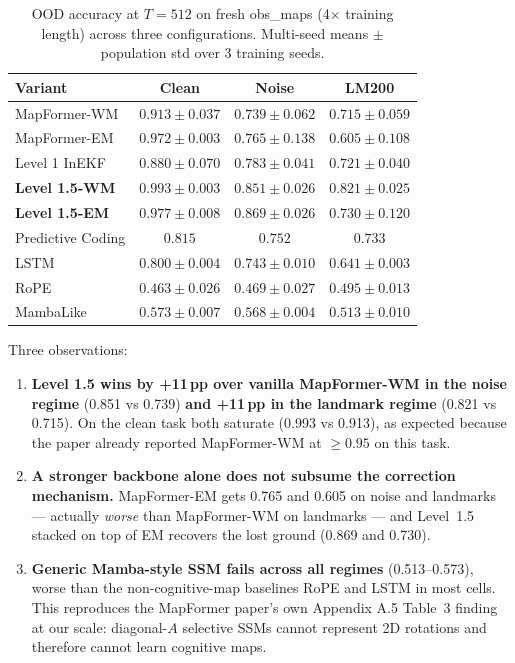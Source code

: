 \begin{table}[h]
\centering
\caption{OOD accuracy at $T{=}512$ on fresh obs\_maps (4$\times$ training
length) across three configurations. Multi-seed means $\pm$ population
std over 3 training seeds.}
\label{tab:main}
\small
\begin{tabular}{lccc}
\toprule
Variant & Clean & Noise & LM200 \\
\midrule
MapFormer-WM & $0.913 \pm 0.037$ & $0.739 \pm 0.062$ & $0.715 \pm 0.059$ \\
MapFormer-EM & $\mathbf{0.972 \pm 0.003}$ & $0.765 \pm 0.138$ & $0.605 \pm 0.108$ \\
Level 1 InEKF & $0.880 \pm 0.070$ & $0.783 \pm 0.041$ & $0.721 \pm 0.040$ \\
\textbf{Level 1.5-WM} & $\mathbf{0.993 \pm 0.003}$ & $0.851 \pm 0.026$ & $\mathbf{0.821 \pm 0.025}$ \\
\textbf{Level 1.5-EM} & $0.977 \pm 0.008$ & $\mathbf{0.869 \pm 0.026}$ & $0.730 \pm 0.120$ \\
Predictive Coding & $0.815$ & $0.752$ & $0.733$ \\
LSTM & $0.800 \pm 0.004$ & $0.743 \pm 0.010$ & $0.641 \pm 0.003$ \\
RoPE & $0.463 \pm 0.026$ & $0.469 \pm 0.027$ & $0.495 \pm 0.013$ \\
MambaLike & $0.573 \pm 0.007$ & $0.568 \pm 0.004$ & $0.513 \pm 0.010$ \\
\bottomrule
\end{tabular}
\end{table}

Three observations:
\begin{enumerate}
  \item \textbf{Level 1.5 wins by +11\,pp over vanilla MapFormer-WM in
  the noise regime} (0.851 vs 0.739) \textbf{and +11\,pp in the landmark
  regime} (0.821 vs 0.715). On the clean task both saturate (0.993 vs
  0.913), as expected because the paper already reported MapFormer-WM at
  $\geq 0.95$ on this task.
  \item \textbf{A stronger backbone alone does not subsume the
  correction mechanism.} MapFormer-EM gets 0.765 and 0.605 on noise and
  landmarks --- actually \emph{worse} than MapFormer-WM on landmarks ---
  and Level~1.5 stacked on top of EM recovers the lost ground (0.869 and
  0.730).
  \item \textbf{Generic Mamba-style SSM fails across all regimes}
  (0.513--0.573), worse than the non-cognitive-map baselines RoPE and
  LSTM in most cells. This reproduces the MapFormer paper's own
  Appendix A.5 Table~3 finding at our scale: diagonal-$A$ selective SSMs
  cannot represent 2D rotations and therefore cannot learn cognitive
  maps.
\end{enumerate}

